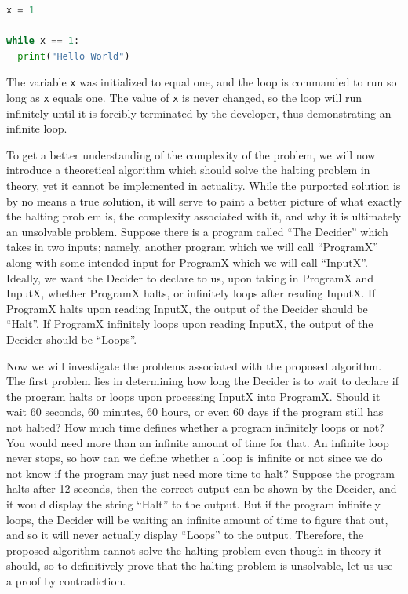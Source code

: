 \documentclass[journal,12pt,onecolumn,draftclsnofoot,]{IEEEtran}
\begin{document}
\begin{lstlisting}[language=Python]  
x = 1 

while x == 1: 
  print("Hello World")
\end{lstlisting}

The variable \verb|x| was initialized to equal one, and the loop is commanded to run so long as \verb|x| equals one. The value of \verb|x| is never changed, so the loop will run infinitely until it is forcibly terminated by the developer, thus demonstrating an infinite loop. 

To get a better understanding of the complexity of the problem, we will now introduce a theoretical algorithm which should solve the halting problem in theory, yet it cannot be implemented in actuality. While the purported solution is by no means a true solution, it will serve to paint a better picture of what exactly the halting problem is, the complexity associated with it, and why it is ultimately an unsolvable problem. Suppose there is a program called “The Decider” which takes in two inputs; namely, another program which we will call “ProgramX” along with some intended input for ProgramX which we will call “InputX”. Ideally, we want the Decider to declare to us, upon taking in ProgramX and InputX, whether ProgramX halts, or infinitely loops after reading InputX. If ProgramX halts upon reading InputX, the output of the Decider should be “Halt”. If ProgramX infinitely loops upon reading InputX, the output of the Decider should be “Loops”.  

Now we will investigate the problems associated with the proposed algorithm. The first problem lies in determining how long the Decider is to wait to declare if the program halts or loops upon processing InputX into ProgramX. Should it wait 60 seconds, 60 minutes, 60 hours, or even 60 days if the program still has not halted? How much time defines whether a program infinitely loops or not? You would need more than an infinite amount of time for that. An infinite loop never stops, so how can we define whether a loop is infinite or not since we do not know if the program may just need more time to halt? Suppose the program halts after 12 seconds, then the correct output can be shown by the Decider, and it would display the string “Halt” to the output. But if the program infinitely loops, the Decider will be waiting an infinite amount of time to figure that out, and so it will never actually display “Loops” to the output. Therefore, the proposed algorithm cannot solve the halting problem even though in theory it should, so to definitively prove that the halting problem is unsolvable, let us use a proof by contradiction. 
\end{document}

